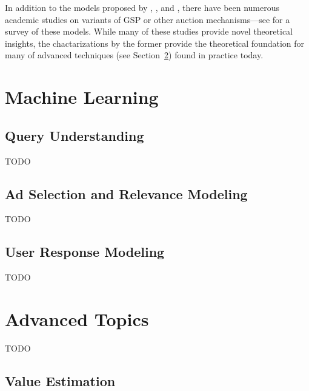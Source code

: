 \documentclass[prodmode,acmtist]{acmsmall} %
\begin{document}
In addition to the models proposed by , , and , there have been numerous academic studies on variants of GSP or other auction mechanisms---see  for a survey of these models.
While many of these studies provide novel theoretical insights, the chactarizations by the former provide the theoretical foundation for many of advanced techniques (see Section~\ref{sec:advanced_topics}) found in practice today.



\section{Machine Learning} %
\label{sec:machine_learning}

\subsection{Query Understanding} %
\label{sub:query_understanding}

TODO



\subsection{Ad Selection and Relevance Modeling} %
\label{sub:ad_selection_and_relevance_modeling}

TODO


\subsection{User Response Modeling} %
\label{sub:user_response_modeling}

TODO


\section{Advanced Topics} %
\label{sec:advanced_topics}

TODO

\subsection{Value Estimation} %
\label{sub:value_estimation}
\end{document}
